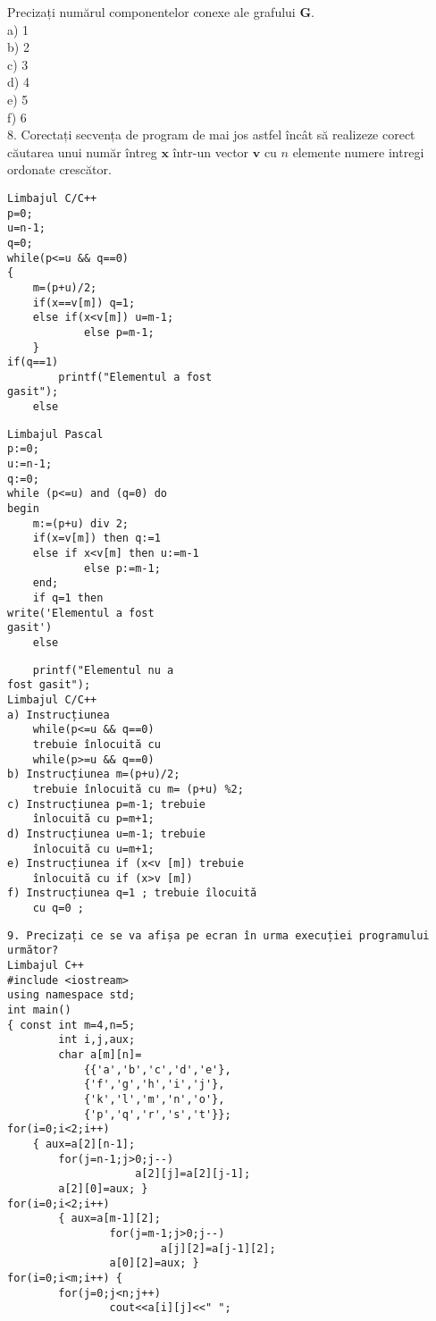 Precizați numărul componentelor conexe ale grafului $\mathbf{G}$.\\
a) 1\\
b) 2\\
c) 3\\
d) 4\\
e) 5\\
f) 6\\
8. Corectați secvența de program de mai jos astfel încât să realizeze corect căutarea unui număr întreg $\mathbf{x}$ într-un vector $\mathbf{v}$ cu $n$ elemente numere intregi ordonate crescător.

\begin{verbatim}
Limbajul C/C++
p=0;
u=n-1;
q=0;
while(p<=u && q==0)
{
    m=(p+u)/2;
    if(x==v[m]) q=1;
    else if(x<v[m]) u=m-1;
            else p=m-1;
    }
if(q==1)
        printf("Elementul a fost
gasit");
    else
\end{verbatim}

\begin{verbatim}
Limbajul Pascal
p:=0;
u:=n-1;
q:=0;
while (p<=u) and (q=0) do
begin
    m:=(p+u) div 2;
    if(x=v[m]) then q:=1
    else if x<v[m] then u:=m-1
            else p:=m-1;
    end;
    if q=1 then
write('Elementul a fost
gasit')
    else
\end{verbatim}

\begin{verbatim}
    printf("Elementul nu a
fost gasit");
Limbajul C/C++
a) Instrucțiunea
    while(p<=u && q==0)
    trebuie înlocuită cu
    while(p>=u && q==0)
b) Instrucțiunea m=(p+u)/2;
    trebuie înlocuită cu m= (p+u) %2;
c) Instrucțiunea p=m-1; trebuie
    înlocuită cu p=m+1;
d) Instrucțiunea u=m-1; trebuie
    înlocuită cu u=m+1;
e) Instrucțiunea if (x<v [m]) trebuie
    înlocuită cu if (x>v [m])
f) Instrucțiunea q=1 ; trebuie îlocuită
    cu q=0 ;
\end{verbatim}

\begin{verbatim}
9. Precizați ce se va afișa pe ecran în urma execuției programului următor?
Limbajul C++
#include <iostream>
using namespace std;
int main()
{ const int m=4,n=5;
        int i,j,aux;
        char a[m][n]=
            {{'a','b','c','d','e'},
            {'f','g','h','i','j'},
            {'k','l','m','n','o'},
            {'p','q','r','s','t'}};
for(i=0;i<2;i++)
    { aux=a[2][n-1];
        for(j=n-1;j>0;j--)
                    a[2][j]=a[2][j-1];
        a[2][0]=aux; }
for(i=0;i<2;i++)
        { aux=a[m-1][2];
                for(j=m-1;j>0;j--)
                        a[j][2]=a[j-1][2];
                a[0][2]=aux; }
for(i=0;i<m;i++) {
        for(j=0;j<n;j++)
                cout<<a[i][j]<<" ";
\end{verbatim}

